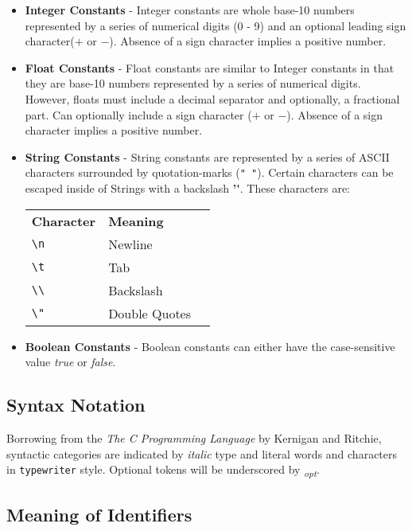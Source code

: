 \documentclass{article}
\begin{document}
\begin{itemize}
\item \textbf{Integer Constants} - Integer constants are whole base-10 numbers represented by a series of numerical digits (0 - 9) and an optional leading sign character($+$ or $-$). Absence of a sign character implies a positive number.

\item \textbf{Float Constants} - Float constants are similar to Integer constants in that they are base-10 numbers represented by a series of numerical digits. However, floats must include a decimal separator and optionally, a fractional part. Can optionally include a sign character ($+$ or $-$). Absence of a sign character implies a positive number.

\item \textbf{String Constants} - String constants are represented by a series of ASCII characters surrounded by quotation-marks (\texttt{" "}). Certain characters can be escaped inside of Strings with a backslash \textbf{'\'}. These characters are:

\begin{tabular}{ l | l | l }
\textbf{Character} & \textbf{Meaning} \\
\texttt{\textbackslash n } & Newline \\
\texttt{\textbackslash t} & Tab \\
\texttt{\textbackslash  \textbackslash} & Backslash \\
\texttt{\textbackslash " } & Double Quotes \\
\end{tabular}

\item \textbf{Boolean Constants} - Boolean constants can either have the case-sensitive value \emph{true} or \emph{false}.

\end{itemize}

\subsection{Syntax Notation}
Borrowing from the \emph{The C Programming Language} by Kernigan and Ritchie, syntactic categories are indicated by \emph{italic} type and literal words and characters in \texttt{typewriter} style. Optional tokens will be underscored by \textsubscript{\emph{opt}}.

\subsection{Meaning of Identifiers}
\end{document}
